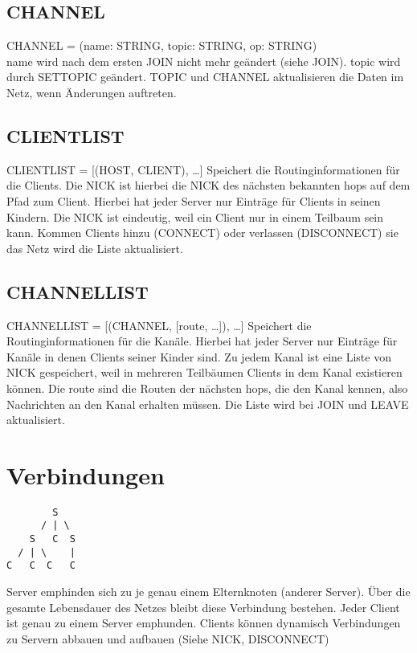 \documentclass{article}
\begin{document}
\subsection{CHANNEL}

CHANNEL = (name: STRING, topic: STRING, op: STRING)\\
name wird nach dem ersten JOIN nicht mehr geändert (siehe JOIN). topic wird durch SETTOPIC geändert. TOPIC und CHANNEL aktualisieren die Daten im Netz, wenn Änderungen auftreten.

\subsection{CLIENTLIST}

CLIENTLIST = [(HOST, CLIENT), \ldots]
Speichert die Routinginformationen für die Clients. Die NICK ist hierbei die NICK des nächsten bekannten hops auf dem Pfad zum Client. Hierbei hat jeder Server nur Einträge für Clients in seinen Kindern. Die NICK ist eindeutig, weil ein Client nur in einem Teilbaum sein kann. Kommen Clients hinzu (CONNECT) oder verlassen (DISCONNECT) sie das Netz wird die Liste aktualisiert.

\subsection{CHANNELLIST}

CHANNELLIST = [(CHANNEL, [route, \ldots]), \ldots]
Speichert die Routinginformationen für die Kanäle. Hierbei hat jeder Server nur Einträge für Kanäle in denen Clients seiner Kinder sind. Zu jedem Kanal ist eine Liste von NICK gespeichert, weil in mehreren Teilbäumen Clients in dem Kanal existieren können. Die route sind die Routen der nächsten hops, die den Kanal kennen, also Nachrichten an den Kanal erhalten müssen. Die Liste wird bei JOIN und LEAVE aktualisiert.


\section{Verbindungen}

\begin{lstlisting}
        S
      / | \
    S   C  S
  / | \    |
C   C  C   C
\end{lstlisting}

Server emphinden sich zu je genau einem Elternknoten (anderer Server). Über die gesamte Lebensdauer des Netzes bleibt diese Verbindung bestehen.
Jeder Client ist genau zu einem Server emphunden.
Clients können dynamisch Verbindungen zu Servern abbauen und aufbauen (Siehe NICK, DISCONNECT)
\end{document}
